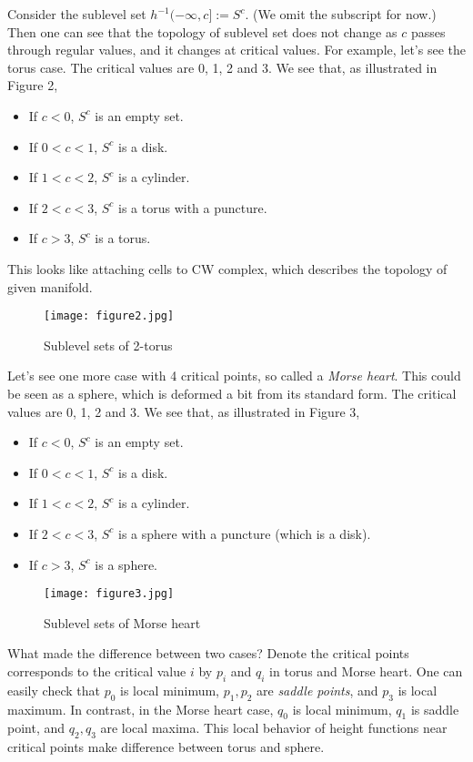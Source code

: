 \documentclass{article}
\begin{document}
Consider the sublevel set $h^{-1}(-\infty,c]:=S^c$. (We omit the subscript for now.)
Then one can see that the topology of sublevel set does not change as $c$ passes through regular values, and it changes at critical values.
For example, let's see the torus case.
The critical values are 0, 1, 2 and 3.
We see that, as illustrated in Figure 2,
	\begin{itemize}
	\item If $c<0$, $S^c$ is an empty set.
	\item If $0< c<1$, $S^c$ is a disk.
	\item If $1< c< 2$, $S^c$ is a cylinder.
	\item If $2< c< 3$, $S^c$ is a torus with a puncture.
	\item If $c>3$, $S^c$ is a torus.
	\end{itemize}
This looks like attaching cells to CW complex, which describes the topology of given manifold.

\begin{figure}[h]
		\centering
		\texttt{[image: figure2.jpg]}
		\caption{Sublevel sets of 2-torus}
\end{figure}

Let's see one more case with 4 critical points, so called a \emph{Morse heart}.
This could be seen as a sphere, which is deformed a bit from its standard form.
The critical values are 0, 1, 2 and 3.
We see that, as illustrated in Figure 3,
	\begin{itemize}
	\item If $c<0$, $S^c$ is an empty set.
	\item If $0< c<1$, $S^c$ is a disk.
	\item If $1< c< 2$, $S^c$ is a cylinder.
	\item If $2< c< 3$, $S^c$ is a sphere with a puncture (which is a disk).
	\item If $c>3$, $S^c$ is a sphere.
	\end{itemize}

\begin{figure}[h]
		\centering
		\texttt{[image: figure3.jpg]}
		\caption{Sublevel sets of Morse heart}
\end{figure}
	
What made the difference between two cases?
Denote the critical points corresponds to the critical value $i$ by $p_i$ and $q_i$ in torus and Morse heart.
One can easily check that $p_0$ is local minimum, $p_1,p_2$ are \emph{saddle points}, and $p_3$ is local maximum.
In contrast, in the Morse heart case, $q_0$ is local minimum, $q_1$ is saddle point, and $q_2,q_3$ are local maxima.
This local behavior of height functions near critical points make difference between torus and sphere.
\end{document}
